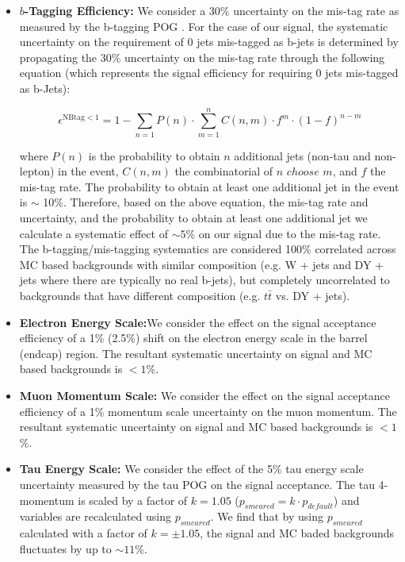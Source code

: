 \begin{itemize}
  \item \textbf{$b$-Tagging Efficiency:} We consider a 30\% uncertainty on the mis-tag rate as measured by the 
b-tagging POG \cite{CMS_PAS_BTV_11-001}. For the case of our signal, the systematic 
uncertainty on the requirement of 0 jets mis-tagged as b-jets is determined by propagating the 30\% uncertainty on the 
mis-tag rate through the following equation (which represents the signal efficiency for requiring 0 
jets mis-tagged as b-Jets):

\begin{equation}\label{eq:nttbar}
  \epsilon^{\textrm{NBtag} < 1} = 1 - \sum_{n=1} P(n) \cdot \sum_{m=1}^{n} C(n,m) \cdot f^{m} \cdot (1-f)^{n-m}
\end{equation}

where $P(n)$ is the probability to obtain $n$ additional jets (non-tau and non-lepton) in the event, $C(n,m)$ the 
combinatorial of $n$ $choose$ $m$, and $f$ the mis-tag rate. The probability to 
obtain at least one additional jet in the event is $\sim$ 10\%. Therefore, based on the above equation, the 
mis-tag rate and uncertainty, and the probability to obtain at least one additional jet we calculate a 
systematic effect of $\sim 5$\% on our signal due to the mis-tag rate. The b-tagging/mis-tagging systematics are considered 100\% correlated across MC based 
backgrounds with similar composition (e.g. W + jets and DY + jets where there are typically no real b-jets), but completely uncorrelated to backgrounds that have 
different composition (e.g. $t\bar{t}$ vs. DY + jets).

  \item \textbf{Electron Energy Scale:}We consider the effect on the signal acceptance efficiency of a 1\% (2.5\%) shift on the electron
  energy scale in the barrel (endcap) region. The resultant systematic uncertainty on signal and MC based backgrounds is $< 1$\%.

  \item \textbf{Muon Momentum Scale:} We consider the effect on the signal acceptance efficiency of a 1\% momentum scale uncertainty on the
  muon momentum. The resultant systematic uncertainty on signal and MC based backgrounds is $< 1$\%.

  \item \textbf{Tau Energy Scale:} We consider the effect of the 5\% tau energy scale uncertainty measured by the tau 
POG on the signal acceptance. The tau 4-momentum is scaled by a factor of $k=1.05$ ($p_{smeared} = k \cdot 
p_{default}$) and variables are recalculated using $p_{smeared}$. We find that by using $p_{smeared}$ calculated with 
a factor of $k=\pm 1.05$, the signal and MC baded backgrounds fluctuates by up to $\sim 11$\%. 


\end{itemize}
